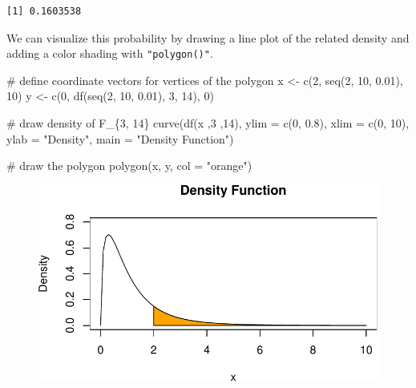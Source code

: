\documentclass[
  letterpaper,
  DIV=11,
  numbers=noendperiod]{scrreprt}
\newenvironment{Shaded}{\begin{snugshade}}{\end{snugshade}}
\newcommand{\AttributeTok}[1]{\textcolor[rgb]{0.40,0.45,0.13}{#1}}
\newcommand{\CommentTok}[1]{\textcolor[rgb]{0.37,0.37,0.37}{#1}}
\newcommand{\DecValTok}[1]{\textcolor[rgb]{0.68,0.00,0.00}{#1}}
\newcommand{\FloatTok}[1]{\textcolor[rgb]{0.68,0.00,0.00}{#1}}
\newcommand{\FunctionTok}[1]{\textcolor[rgb]{0.28,0.35,0.67}{#1}}
\newcommand{\NormalTok}[1]{\textcolor[rgb]{0.00,0.23,0.31}{#1}}
\newcommand{\OtherTok}[1]{\textcolor[rgb]{0.00,0.23,0.31}{#1}}
\newcommand{\StringTok}[1]{\textcolor[rgb]{0.13,0.47,0.30}{#1}}
\theoremstyle{definition}
\theoremstyle{plain}
\theoremstyle{plain}
\theoremstyle{remark}
\begin{document}
\begin{verbatim}
[1] 0.1603538
\end{verbatim}

We can visualize this probability by drawing a line plot of the related
density and adding a color shading with \texttt{"polygon()"}.

\begin{Shaded}
\begin{Highlighting}[]
\CommentTok{\# define coordinate vectors for vertices of the polygon}
\NormalTok{x }\OtherTok{\textless{}{-}} \FunctionTok{c}\NormalTok{(}\DecValTok{2}\NormalTok{, }\FunctionTok{seq}\NormalTok{(}\DecValTok{2}\NormalTok{, }\DecValTok{10}\NormalTok{, }\FloatTok{0.01}\NormalTok{), }\DecValTok{10}\NormalTok{)}
\NormalTok{y }\OtherTok{\textless{}{-}} \FunctionTok{c}\NormalTok{(}\DecValTok{0}\NormalTok{, }\FunctionTok{df}\NormalTok{(}\FunctionTok{seq}\NormalTok{(}\DecValTok{2}\NormalTok{, }\DecValTok{10}\NormalTok{, }\FloatTok{0.01}\NormalTok{), }\DecValTok{3}\NormalTok{, }\DecValTok{14}\NormalTok{), }\DecValTok{0}\NormalTok{)}

\CommentTok{\# draw density of F\_\{3, 14\}}
\FunctionTok{curve}\NormalTok{(}\FunctionTok{df}\NormalTok{(x ,}\DecValTok{3}\NormalTok{ ,}\DecValTok{14}\NormalTok{), }
      \AttributeTok{ylim =} \FunctionTok{c}\NormalTok{(}\DecValTok{0}\NormalTok{, }\FloatTok{0.8}\NormalTok{), }
      \AttributeTok{xlim =} \FunctionTok{c}\NormalTok{(}\DecValTok{0}\NormalTok{, }\DecValTok{10}\NormalTok{), }
      \AttributeTok{ylab =} \StringTok{"Density"}\NormalTok{,}
      \AttributeTok{main =} \StringTok{"Density Function"}\NormalTok{)}

\CommentTok{\# draw the polygon}
\FunctionTok{polygon}\NormalTok{(x, y, }\AttributeTok{col =} \StringTok{"orange"}\NormalTok{)}
\end{Highlighting}
\end{Shaded}

\begin{figure}[H]

{\centering \includegraphics{./02-Review-Prob_n_Stats_files/figure-pdf/unnamed-chunk-16-1.pdf}

}

\end{figure}
\end{document}
